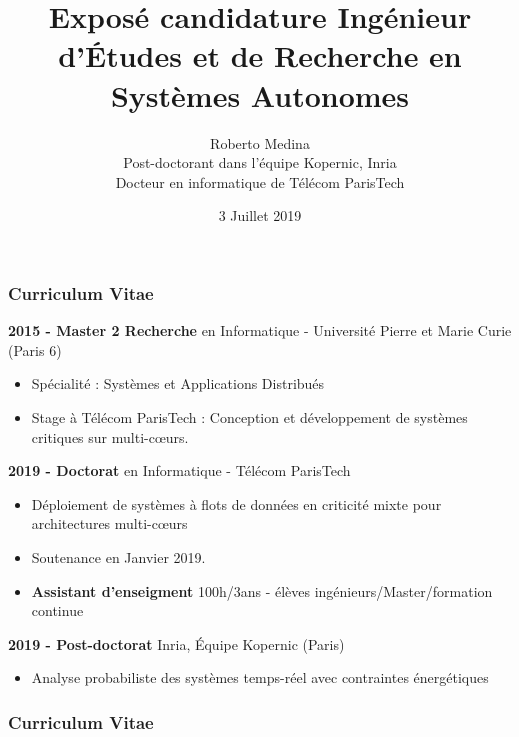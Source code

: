 \documentclass[compress]{beamer}
\title{Exposé candidature Ingénieur d'Études et de Recherche en Systèmes 
Autonomes}
\author{Roberto Medina\\
Post-doctorant dans l'équipe Kopernic, Inria\\
Docteur en informatique de Télécom ParisTech}
\date{3 Juillet 2019}
\begin{document}
{
	\begin{frame}
	\maketitle
	\end{frame}
}


\begin{frame}
	\frametitle{Curriculum Vitae}
	\begin{block}{\textbf{2015 - Master 2 Recherche} en Informatique - 
	Université Pierre et Marie Curie (Paris 6)}
		\begin{itemize}
			\item Spécialité : Systèmes et Applications Distribués
			\item Stage à Télécom ParisTech : Conception et développement de 
			systèmes critiques sur multi-c\oe{}urs.
		\end{itemize}
	\end{block}

	\begin{block} {\textbf{2019 - Doctorat} en Informatique - Télécom ParisTech}
		\begin{itemize}
		\item Déploiement de systèmes à flots de données en criticité mixte 
		pour architectures multi-c\oe{}urs
		\item Soutenance en Janvier 2019.
		\item \textbf{Assistant d'enseigment} 100h/3ans - élèves 
		ingénieurs/Master/formation continue
		\end{itemize}
	\end{block}
	\begin{block}{\textbf{2019 - Post-doctorat} Inria, Équipe Kopernic (Paris)}
	\begin{itemize}
		\item Analyse probabiliste des systèmes temps-réel avec contraintes 
		énergétiques
	\end{itemize}
	\end{block}
\end{frame}

\begin{frame}
	\frametitle{Curriculum Vitae}

\end{frame}
\end{document}
